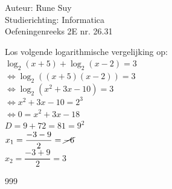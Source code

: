 \documentclass[a4paper]{article}
\begin{document}
  
\noindent \large Auteur: Rune Suy \\
\noindent \large Studierichting: Informatica\\
\noindent \large Oefeningenreeks 2E nr. 26.31\\

\medskip

\normalsize

Los volgende logarithmische vergelijking op: \\

$\log_2(x+5) + \log_2(x-2) = 3$\\

$\Leftrightarrow \log_2((x+5)(x-2)) = 3$\\

$\Leftrightarrow \log_2(x^2 + 3x - 10) = 3$\\

$\Leftrightarrow x^2 + 3x - 10 = 2^3$\\

$\Leftrightarrow 0 = x^2 + 3x - 18$\\

$D = 9 + 72 = 81 = 9^2$\\

$x_1 = \dfrac{-3-9}{2} = \cancel{-6}$\\

$x_2 = \dfrac{-3+9}{2} = 3$\\

\begin{thebibliography}{999}
\end{thebibliography}
\end{document}
